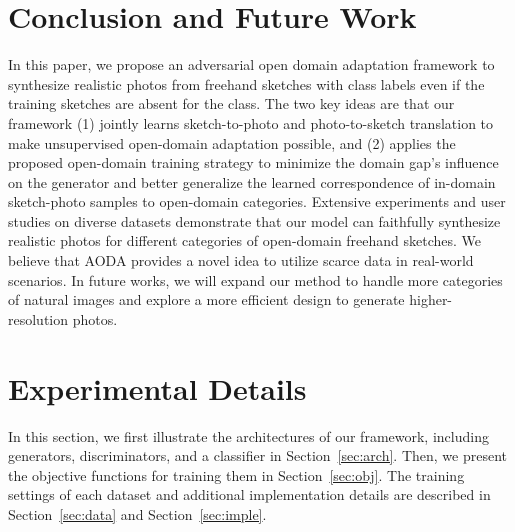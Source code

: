 \documentclass[10pt,twocolumn,letterpaper]{article}
\begin{document}
\section{Conclusion and Future Work}
In this paper, we propose an adversarial open domain adaptation framework to synthesize realistic photos from freehand sketches with class labels even if the training sketches are absent for the class. The two key ideas are that our framework (1) jointly learns sketch-to-photo and photo-to-sketch translation to make unsupervised open-domain adaptation  possible, and (2) applies the proposed open-domain training strategy to minimize the domain gap's influence on the generator and better generalize the learned correspondence of in-domain sketch-photo samples to open-domain categories. Extensive experiments and user studies on diverse datasets demonstrate that our model can faithfully synthesize realistic photos for different categories of open-domain freehand sketches. We believe that AODA provides a novel idea to utilize scarce data in real-world scenarios. In future works, we will expand our method to handle more categories of natural images and explore a more efficient design to generate higher-resolution photos. 





\clearpage
\pagebreak

\twocolumn[{
\begin{center}
  \textbf{\large Adversarial Open Domain Adaptation for Sketch-to-Photo Synthesis\\Supplementary  Material}\.1cm]
  {\itshape Purdue University, ByteDance Inc.\\
  \tt\small \{xiang43,allebach\}@purdue.edu, \\
  \tt\small{\{liuding,yangxiao.0,yiheng.zhu,shenxiaohui\}@bytedance.com} \\
  }
\end{center}
\vspace{2mm}
}]








\appendix


\section{Experimental Details} 
\label{sec:exp_details}
In this section, we first illustrate the architectures of our framework, including generators, discriminators, and a classifier in Section~\ref{sec:arch}. Then, we present the objective functions for training them in Section~\ref{sec:obj}. The training settings of each dataset and additional implementation details are described in Section~\ref{sec:data} and Section~\ref{sec:imple}.
\end{document}
